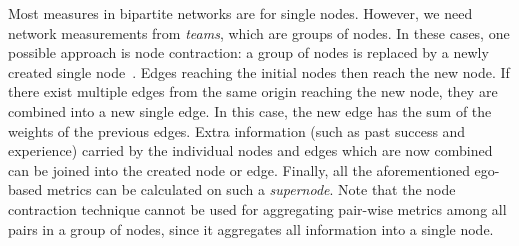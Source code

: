 Most measures in bipartite networks are for single nodes. However, we need
network measurements from \textit{teams}, which are groups of nodes. In these
cases, one possible approach is node contraction: a group of nodes is replaced
by a newly created single node~\citep{gross2005graph, west2001introduction}.
Edges reaching the initial nodes then reach the new node. If there exist
multiple edges from the same origin reaching the new node, they are combined
into a new single edge. In this case, the new edge has the sum of the weights
of the previous edges. Extra information (such as past success and experience)
carried by the individual nodes and edges which are now combined can be joined
into the created node or edge. Finally, all the aforementioned ego-based
metrics can be calculated on such a \textit{supernode}. Note that the node
contraction technique cannot be used for aggregating pair-wise metrics among
all pairs in a group of nodes, since it aggregates all information into a
single node.
